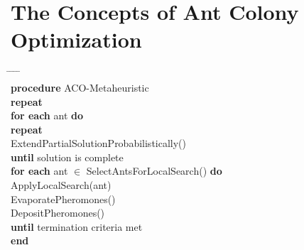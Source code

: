 \section{The Concepts of Ant Colony Optimization}

\begin{algorithm}
\begin{tabbing}
\hspace*{1cm} \= \hspace*{1cm} \= \hspace*{1cm} \= \hspace*{1cm} \= \hspace*{1cm} \= \\
\textbf{procedure} ACO-Metaheuristic \\
\> \textbf{repeat} \\
\> \> \textbf{for each} ant \textbf{do} \\
\> \> \> \textbf{repeat} \\
\> \> \> \> ExtendPartialSolutionProbabilistically() \\
\> \> \> \textbf{until} solution is complete \\
\> \> \textbf{for each} ant $\in$ SelectAntsForLocalSearch() \textbf{do} \\
\> \> \> ApplyLocalSearch(ant) \\
\> \> EvaporatePheromones() \\
\> \> DepositPheromones() \\
\> \textbf{until} termination criteria met \\
\textbf{end}
\end{tabbing}
\end{algorithm}
